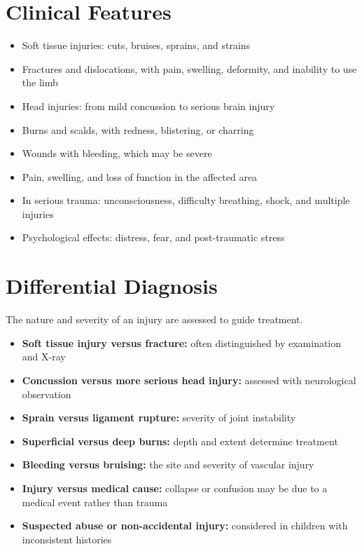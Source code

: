 \section*{Clinical Features}
\begin{itemize}
    \item Soft tissue injuries: cuts, bruises, sprains, and strains
    \item Fractures and dislocations, with pain, swelling, deformity, and inability to use the limb
    \item Head injuries: from mild concussion to serious brain injury
    \item Burns and scalds, with redness, blistering, or charring
    \item Wounds with bleeding, which may be severe
    \item Pain, swelling, and loss of function in the affected area
    \item In serious trauma: unconsciousness, difficulty breathing, shock, and multiple injuries
    \item Psychological effects: distress, fear, and post-traumatic stress
\end{itemize}

\section*{Differential Diagnosis}
The nature and severity of an injury are assessed to guide treatment.
\begin{itemize}
    \item \textbf{Soft tissue injury versus fracture:} often distinguished by examination and X-ray
    \item \textbf{Concussion versus more serious head injury:} assessed with neurological observation
    \item \textbf{Sprain versus ligament rupture:} severity of joint instability
    \item \textbf{Superficial versus deep burns:} depth and extent determine treatment
    \item \textbf{Bleeding versus bruising:} the site and severity of vascular injury
    \item \textbf{Injury versus medical cause:} collapse or confusion may be due to a medical event rather than trauma
    \item \textbf{Suspected abuse or non-accidental injury:} considered in children with inconsistent histories
\end{itemize}

